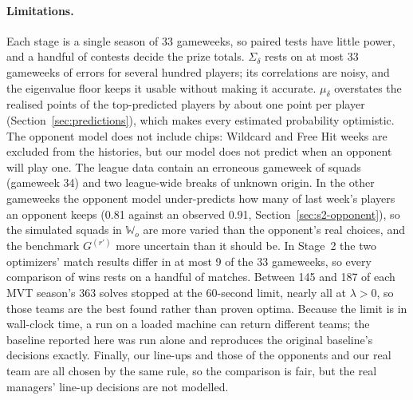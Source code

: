 \documentclass[12pt,oneside,a4paper]{book}
\theoremstyle{definition}
\theoremstyle{remark}
\begin{document}
	\paragraph{Limitations.} Each stage is a single season of 33 gameweeks, so paired tests have
	little power, and a handful of contests decide the prize totals. $\Sigma_\delta$ rests on at
	most 33 gameweeks of errors for several hundred players; its correlations are noisy, and the
	eigenvalue floor keeps it usable without making it accurate. $\mu_\delta$ overstates the
	realised points of the top-predicted players by about one point per player
	(Section~\ref{sec:predictions}), which makes every estimated probability optimistic. The
	opponent model does not include chips: Wildcard and Free Hit weeks are excluded from the
	histories, but our model does not predict when an opponent will play one. The league data
	contain an erroneous gameweek of squads (gameweek 34) and two league-wide breaks of unknown
	origin. In the other gameweeks the opponent model under-predicts how many of last week's
	players an opponent keeps (0.81 against an observed 0.91, Section~\ref{sec:s2-opponent}), so the
	simulated squads in $\mathbb{W}_o$ are more varied than the opponent's real choices, and the
	benchmark $G^{(r')}$ more uncertain than it should be. In Stage~2 the two optimizers' match results differ in at most 9 of the 33 gameweeks,
	so every comparison of wins rests on a handful of matches. Between 145 and 187 of each MVT
	season's 363 solves stopped at the 60-second limit, nearly all at $\lambda>0$, so those teams
	are the best found rather than proven optima. Because the limit is in wall-clock time, a run on a loaded machine can return
	different teams; the baseline reported here was run alone and reproduces the original
	baseline's decisions exactly. Finally, our line-ups and those of the opponents and our real
	team are all chosen by the same rule, so the comparison is fair, but the real managers'
	line-up decisions are not modelled.



	\appendix
\end{document}
